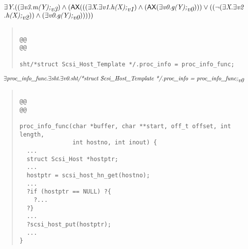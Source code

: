\documentclass{article}
\newcommand{\AX}{\mbox{\sf{AX}}}
\newcommand{\mita}[1]{\mbox{\it{{#1}}}}
\begin{document}
\[\begin{array}{l}
\exists \mita{Y} . ((\exists \mita{v3} . \mita{m(Y);}_{\mita{v3}}) \wedge (\AX(((\exists \mita{X} . \exists \mita{v1} . \mita{h(X);}_{\mita{v1}}) \wedge (\AX(\exists \mita{v0} . \mita{g(Y);}_{\mita{v0}}))) \vee ((\neg (\exists \mita{X} . \exists \mita{v2}\\\mbox{} . \mita{h(X);}_{\mita{v2}})) \wedge (\exists \mita{v0} . \mita{g(Y);}_{\mita{v0}})))))
\end{array}\]

\begin{quote}\begin{verbatim}

@@
@@

sht/*struct Scsi_Host_Template */.proc_info = proc_info_func;
\end{verbatim}\end{quote}

\[\begin{array}{l}
\exists \mita{proc\_info\_func} . \exists \mita{sht} . \exists \mita{v0} . \mita{sht/*struct Scsi\_Host\_Template */.proc\_info = proc\_info\_func;}_{\mita{v0}}
\end{array}\]

\begin{quote}\begin{verbatim}

@@
@@

proc_info_func(char *buffer, char **start, off_t offset, int length,
               int hostno, int inout) {
  ...
  struct Scsi_Host *hostptr;
  ...
  hostptr = scsi_host_hn_get(hostno);
  ...
  ?if (hostptr == NULL) ?{
    ?...
  ?}
  ...
  ?scsi_host_put(hostptr);
  ...
}
\end{verbatim}\end{quote}
\end{document}
